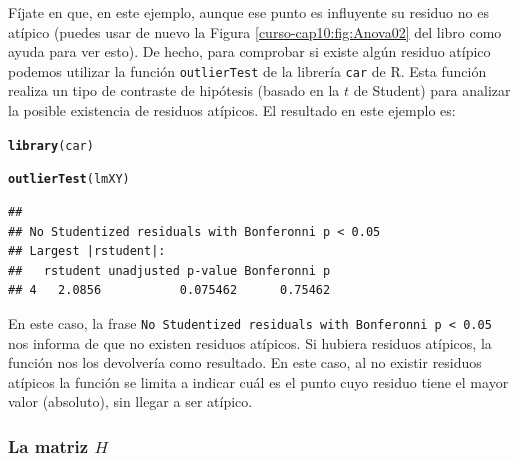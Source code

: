 \documentclass[10pt,a4paper]{article}\usepackage[]{graphicx}\usepackage[]{color}
\makeatletter
\newcommand{\hlstd}[1]{\textcolor[rgb]{0.345,0.345,0.345}{#1}}%
\newcommand{\hlkwd}[1]{\textcolor[rgb]{0.737,0.353,0.396}{\textbf{#1}}}%
\newenvironment{kframe}{%
 \def\at@end@of@kframe{}%
 \ifinner\ifhmode%
  \def\at@end@of@kframe{\end{minipage}}%
  \begin{minipage}{\columnwidth}%
 \fi\fi%
 \def\FrameCommand##1{\hskip\@totalleftmargin \hskip-\fboxsep
 \colorbox{shadecolor}{##1}\hskip-\fboxsep
     \hskip-\linewidth \hskip-\@totalleftmargin \hskip\columnwidth}%
 \MakeFramed {\advance\hsize-\width
   \@totalleftmargin\z@ \linewidth\hsize
   \@setminipage}}%
 {\par\unskip\endMakeFramed%
 \at@end@of@kframe}
\newenvironment{knitrout}{}{} %
\newcounter {cont01}
\makeatother
\begin{document}
Fíjate en que, en este ejemplo, aunque ese punto es influyente su residuo no es atípico (puedes usar de nuevo la Figura \ref{curso-cap10:fig:Anova02} del libro como ayuda para ver esto).  De hecho, para comprobar si existe algún residuo atípico podemos utilizar la función {\tt outlierTest} de la librería {\tt car} de R.  Esta función realiza un tipo de contraste de hipótesis (basado en la $t$ de Student) para analizar la posible existencia de residuos atípicos. El resultado en este ejemplo es:
\begin{knitrout}
\color{fgcolor}\begin{kframe}
\begin{alltt}
\hlkwd{library}\hlstd{(car)}
\end{alltt}


{\ttfamily\noindent\itshape\color{messagecolor}{\#\# \\\#\# Attaching package: 'car'}}

{\ttfamily\noindent\itshape\color{messagecolor}{\#\# The following objects are masked from 'package:BSDA':\\\#\# \\\#\#\ \ \ \  Vocab, Wool}}

{\ttfamily\noindent\itshape\color{messagecolor}{\#\# The following object is masked from 'package:gtools':\\\#\# \\\#\#\ \ \ \  logit}}\begin{alltt}
\hlkwd{outlierTest}\hlstd{(lmXY)}
\end{alltt}
\begin{verbatim}
## 
## No Studentized residuals with Bonferonni p < 0.05
## Largest |rstudent|:
##   rstudent unadjusted p-value Bonferonni p
## 4   2.0856           0.075462      0.75462
\end{verbatim}
\end{kframe}
\end{knitrout}
En este caso, la frase {\tt No Studentized residuals with Bonferonni p < 0.05} nos informa de que no existen residuos atípicos. Si hubiera residuos atípicos, la función nos los devolvería como resultado. En este caso, al no existir residuos atípicos la función se limita a indicar cuál es el punto cuyo residuo tiene el mayor valor (absoluto), sin llegar a ser atípico.

\subsubsection*{La matriz $H$}
\end{document}
